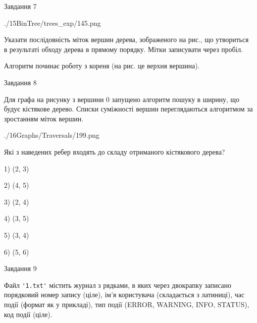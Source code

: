 \documentclass[12pt, ukrainian]{article}
\def\code#1{\Verb!#1!}
\begin{document}
{\vspace{10mm}\par

\newpage
\begin{minipage}[t]{9.7cm}
               
{\begin{center}Завдання {7}\end{center}}
\vspace{-6mm}

\begin{center}
	{./15BinTree/trees_exp/145.png}
\end{center}
Указати послідовність міток вершин дерева, зображеного на рис., що утвориться в результаті обходу дерева в прямому порядку. Мітки записувати через пробіл.\par Алгоритм починає роботу з кореня (на рис. це верхня вершина).\par

\end{minipage}
\vline \hspace{8mm}
\begin{minipage}[t]{8.0cm}
               
{\begin{center}Завдання {8}\end{center}}
\vspace{-6mm}
Для графа на рисунку з вершини 0 запущено алгоритм пошуку в ширину, що будує кістякове дерево. Списки суміжності вершин переглядаються алгоритмом за зростанням міток вершин.\par
\begin{center}
	{./16Graphs/Traversals/199.png}
\end{center}
\par Які з наведених ребер входять до складу отриманого кістякового дерева?\par
1) (2, 3)\par
2) (4, 5)\par
3) (2, 4)\par
4) (3, 5)\par
5) (3, 4)\par
6) (5, 6)\par
{\vskip 15pt} \par

\end{minipage}

               
{\begin{center}Завдання {9}\end{center}}
\vspace{-6mm}
Файл \code{'1.txt'} містить журнал з рядками, в яких через двокрапку записано поряд\-ко\-вий номер запису (ціле), ім'я користувача (складається з латиниці), час події (фор\-мат як у прикладі), тип події (ERROR, WARNING, INFO, STATUS), код події (ціле).

}
\end{document}
